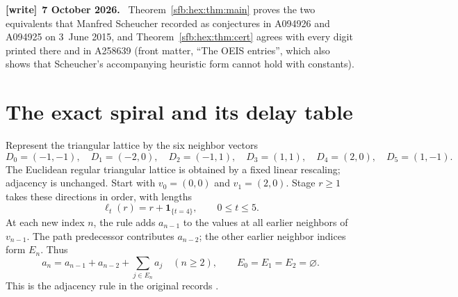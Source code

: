 \documentclass[11pt]{article}
\theoremstyle{remark}\newtheorem{remark}[theorem]{Remark}
\newcommand{\one}{\boldsymbol 1}
\newenvironment{writenote}[1][]{\par\smallskip\begingroup\small
 \noindent\textbf{[write]}\if\relax\detokenize{#1}\relax\else~\textbf{#1.}\fi\ }%
 {\par\endgroup\smallskip}
\begin{document}
\begin{writenote}[7 October 2026]
Theorem~\ref{sfb:hex:thm:main} proves the two equivalents that Manfred Scheucher recorded as conjectures in A094926 and A094925 on 3~June 2015, and Theorem~\ref{sfb:hex:thm:cert} agrees with every digit printed there and in A258639 (front matter, ``The OEIS entries'', which also shows that Scheucher's accompanying heuristic form cannot hold with constants).
\end{writenote}

\section{The exact spiral and its delay table}\label{sfb:hex:sec:geometry}
Represent the triangular lattice by the six neighbor vectors
\begin{equation}\label{sfb:hex:eq:directions}
 D_0=(-1,-1),\quad D_1=(-2,0),\quad D_2=(-1,1),\quad
 D_3=(1,1),\quad D_4=(2,0),\quad D_5=(1,-1).
\end{equation}
The Euclidean regular triangular lattice is obtained by a fixed linear rescaling; adjacency is unchanged. Start with $v_0=(0,0)$ and $v_1=(2,0)$. Stage $r\ge1$ takes these directions in order, with lengths
\begin{equation}\label{sfb:hex:eq:lengths}
 \ell_t(r)=r+\one_{\{t=4\}},\qquad 0\le t\le5.
\end{equation}
At each new index $n$, the rule adds $a_{n-1}$ to the values at all earlier neighbors of $v_{n-1}$. The path predecessor contributes $a_{n-2}$; the other earlier neighbor indices form $E_n$. Thus
\begin{equation}\label{sfb:hex:eq:recurrence}
 a_n=a_{n-1}+a_{n-2}+\sum_{j\in E_n}a_j\quad(n\ge2),
 \qquad E_0=E_1=E_2=\varnothing.
\end{equation}
This is the adjacency rule in the original records \cite{oeis926,oeis925}.
\end{document}
